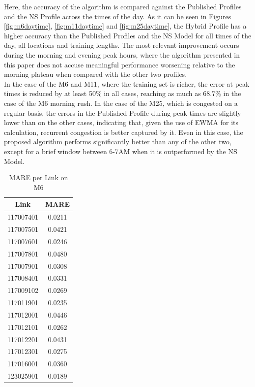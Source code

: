 \documentclass[letterpaper, 10 pt, conference]{ieeeconf}  %
\begin{document}
Here, the accuracy of the algorithm is compared against the Published Profiles and the NS Profile across the times of the day.
As it can be seen in Figures \ref{fig:m6daytime}, \ref{fig:m11daytime} and \ref{fig:m25daytime}, the Hybrid Profile has a higher accuracy than the Published Profiles and the NS Model for all times of the day, all locations and training lengths. 
The most relevant improvement occurs during the morning and evening peak hours, where the algorithm presented in this paper does not accuse meaningful performance worsening relative to the morning plateau when compared with the other two profiles.\\
In the case of the M6 and M11, where the training set is richer, the error at peak times is reduced by at least 50\% in all cases, reaching as much as 68.7\% in the case of the M6 morning rush.
In the case of the M25, which is congested on a regular basis, the errors in the Published Profile during peak times are slightly lower than on the other cases, indicating that, given the use of EWMA for its calculation, recurrent congestion is better captured by it. 
Even in this case, the proposed algorithm performs significantly better than any of the other two, except for a brief window between 6-7AM when it is outperformed by the NS Model.

\begin{table}[htbp]
	\caption{MARE per Link on M6}
	\begin{center}
		\begin{tabular}{|c|c|}
			\hline
			\textbf{Link}&{\textbf{MARE}} \\
			\hline
			117007401& 0.0211\\
			\hline
			117007501& 0.0421\\
			\hline
			117007601& 0.0246\\
			\hline
			117007801& 0.0480\\
			\hline
			117007901& 0.0308\\
			\hline
			117008401& 0.0331\\
			\hline
			117009102& 0.0269\\
			\hline
			117011901& 0.0235\\
			\hline
			117012001& 0.0446\\
			\hline
			117012101& 0.0262\\
			\hline
			117012201& 0.0431\\
			\hline
			117012301& 0.0275\\
			\hline
			117016001& 0.0360\\
			\hline
			123025901& 0.0189\\
			\hline
		\end{tabular}
		\label{tab1}
	\end{center}
	\label{table:m6mape}
\end{table}
\end{document}
